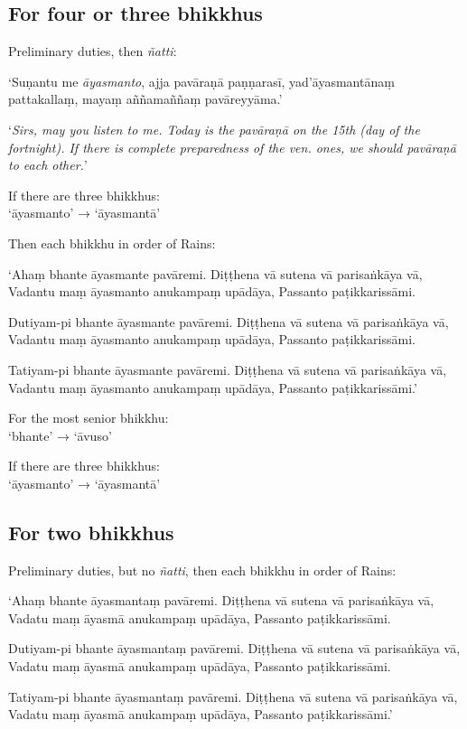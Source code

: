 \subsection{For four or three bhikkhus}

Preliminary duties, then \emph{ñatti}:

‘Suṇantu me \emph{āyasmanto}, ajja pavāraṇā paṇṇarasī, yad'āyasmantānaṃ
pattakallaṃ, mayaṃ aññamaññaṃ pavāreyyāma.’

‘\emph{Sirs, may you listen to me. Today is the pavāraṇā on the 15th (day of the
fortnight). If there is complete preparedness of the ven. ones, we should
pavāraṇā to each other.}’


If there are three bhikkhus:\\
‘āyasmanto’ → ‘āyasmantā’

Then each bhikkhu in order of Rains:

‘Ahaṃ bhante āyasmante pavāremi. Diṭṭhena vā sutena vā parisaṅkāya vā, Vadantu
maṃ āyasmanto anukampaṃ upādāya, Passanto paṭikkarissāmi.

Dutiyam-pi bhante āyasmante pavāremi. Diṭṭhena vā sutena vā parisaṅkāya vā,
Vadantu maṃ āyasmanto anukampaṃ upādāya, Passanto paṭikkarissāmi.

Tatiyam-pi bhante āyasmante pavāremi. Diṭṭhena vā sutena vā parisaṅkāya vā,
Vadantu maṃ āyasmanto anukampaṃ upādāya, Passanto paṭikkarissāmi.’

For the most senior bhikkhu:\\
‘bhante’ → ‘āvuso’

If there are three bhikkhus:\\
‘āyasmanto’ → ‘āyasmantā’

\subsection{For two bhikkhus}

Preliminary duties, but no \emph{ñatti}, then each bhikkhu in order of Rains:

‘Ahaṃ bhante āyasmantaṃ pavāremi. Diṭṭhena vā sutena vā parisaṅkāya vā, Vadatu
maṃ āyasmā anukampaṃ upādāya, Passanto paṭikkarissāmi.

Dutiyam-pi bhante āyasmantaṃ pavāremi. Diṭṭhena vā sutena vā parisaṅkāya vā,
Vadatu maṃ āyasmā anukampaṃ upādāya, Passanto paṭikkarissāmi.

Tatiyam-pi bhante āyasmantaṃ pavāremi. Diṭṭhena vā sutena vā parisaṅkāya vā,
Vadatu maṃ āyasmā anukampaṃ upādāya, Passanto paṭikkarissāmi.’

